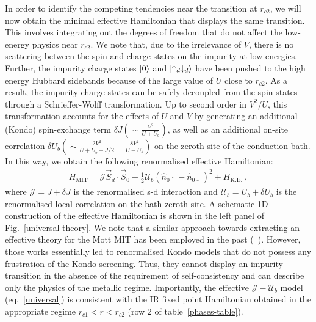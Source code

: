 \documentclass{iopart}
\begin{document}
In order to identify the competing tendencies near the transition at \(r_{c2}\), we will now obtain the minimal effective Hamiltonian that displays the same transition. This involves integrating out the degrees of freedom that do not affect the low-energy physics near \(r_{c2}\).
We note that, due to the irrelevance of \(V\), there is no scattering between the spin and charge states on the impurity at low energies.
Further, the impurity charge states \(\ket{0}\) and \(\ket{\uparrow_d \downarrow_d}\) have been pushed to the high energy Hubbard sidebands because of the large value of \(U\) close to \(r_{c2}\).
As a result, the impurity charge states can be safely decoupled from the spin states through a Schrieffer-Wolff transformation. Up to second order in $V^{2}/U$, this transformation accounts for the effects of \(U\) and \(V\) by generating an additional (Kondo) spin-exchange term \(\delta J \left(\sim \frac{V^2}{U+U_b}\right)\), as well as an additional on-site correlation \(\delta U_b\left(\sim \frac{2V^2}{U+U_b+J/2} - \frac{8V^{2}}{U-U_{b}}\right)\) on the zeroth site of the conduction bath. In this way, we obtain the following renormalised effective Hamiltonian:
\begin{eqnarray}
	\label{universal}
	H_\text{MIT} = \mathcal{J} \vec{S}_d\cdot\vec{S}_0 - \frac{1}{2}\mathcal{U}_b\left(\hat n_{0 \uparrow} - \hat n_{0 \downarrow}\right)^2 + H_\text{K.E.}~,
\end{eqnarray}
where \(\mathcal{J} = J + \delta J\) is the renormalised s-d interaction and \(\mathcal{U}_b = U_b + \delta U_b\) is the renormalised local correlation on the bath zeroth site.
A schematic 1D construction of the effective Hamiltonian is shown in the left panel of Fig.~\eqref{universal-theory}.
We note that a similar approach towards extracting an effective theory for the Mott MIT has been employed in the past (~\cite{moeller_1995,held_2013}). However, those works essentially led to renormalised Kondo models that do not possess any frustration of the Kondo screening. Thus, they cannot display an impurity transition in the absence of the requirement of self-consistency and can describe only the physics of the metallic regime. Importantly, the effective \(\mathcal{J}-\mathcal{U}_b\) model (eq.~\eqref{universal}) is consistent with the IR fixed point Hamiltonian obtained in the appropriate regime \(r_{c1} < r < r_{c2}\) (row 2 of table~\eqref{phases-table}).
\end{document}

